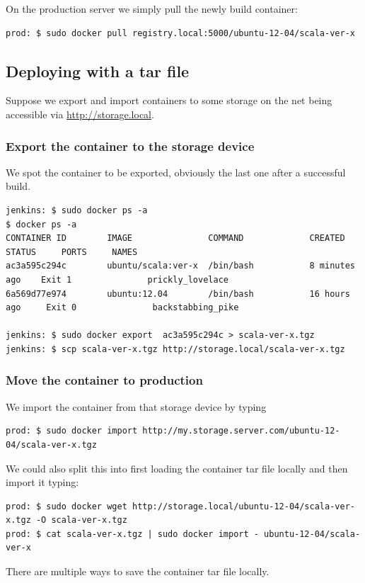 \documentclass[captions=tableheading]{article}
\begin{document}
On the production server we simply pull the newly build container:

\begin{verbatim}
prod: $ sudo docker pull registry.local:5000/ubuntu-12-04/scala-ver-x
\end{verbatim}
\subsection{Deploying with a tar file}
\label{sec-6-3}

Suppose we export and import containers to some storage on the net being accessible via \href{http://storage.local}{http://storage.local}.
\subsubsection{Export the container to the storage device}
\label{sec-6-3-1}

We spot the container to be exported, obviously the last one after a successful build.

\begin{verbatim}
jenkins: $ sudo docker ps -a
$ docker ps -a
CONTAINER ID        IMAGE               COMMAND             CREATED          STATUS     PORTS     NAMES
ac3a595c294c        ubuntu/scala:ver-x  /bin/bash           8 minutes ago    Exit 1               prickly_lovelace    
6a569d77e974        ubuntu:12.04        /bin/bash           16 hours ago     Exit 0               backstabbing_pike 

jenkins: $ sudo docker export  ac3a595c294c > scala-ver-x.tgz
jenkins: $ scp scala-ver-x.tgz http://storage.local/scala-ver-x.tgz
\end{verbatim}
\subsubsection{Move the container to production}
\label{sec-6-3-2}

We import the container from that storage device by typing 

\begin{verbatim}
prod: $ sudo docker import http://my.storage.server.com/ubuntu-12-04/scala-ver-x.tgz
\end{verbatim}
We could also split this into first loading the container tar file locally and then import it typing:

\begin{verbatim}
prod: $ sudo docker wget http://storage.local/ubuntu-12-04/scala-ver-x.tgz -O scala-ver-x.tgz
prod: $ cat scala-ver-x.tgz | sudo docker import - ubuntu-12-04/scala-ver-x
\end{verbatim}
There are multiple ways to save the container tar file locally.
\end{document}
